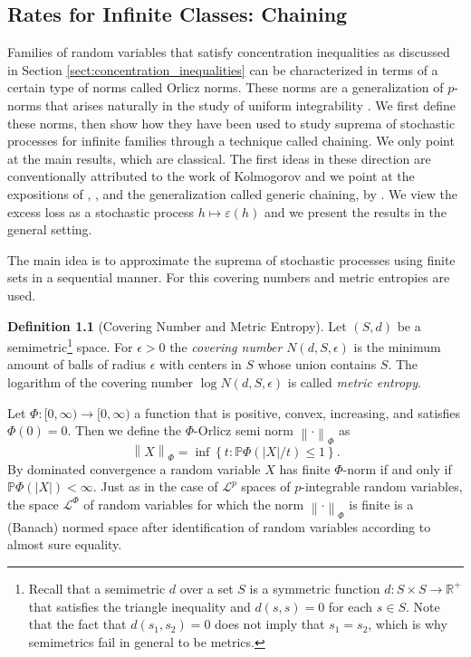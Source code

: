 \documentclass{uvamath}
\newcommand*{\reals}{\mathbb{R}}
\newcommand*{\calL}{\mathcal{L}}
\newcommand*{\bbP}{\mathbb{P}}
\newcommand*{\bracks}[1]{\left\{#1\right\}}
\newcommand*{\abs}[1]{\left|#1\right|}
\newcommand*{\norm}[1]{\left\lVert#1\right\rVert}
\theoremstyle{remark}
\theoremstyle{definition}
\theoremstyle{definition}
\newtheorem{definition}[theorem]{Definition}
\theoremstyle{definition}
\theoremstyle{definition}
\theoremstyle{definition}
\begin{document}
\begin{appendices}
\chapter{Rates for Infinite Classes: Chaining \label{sect:chaining}}

Families of random variables that satisfy concentration inequalities
as discussed in Section \ref{sect:concentration_inequalities} can be
characterized in terms of a certain type of norms called Orlicz
norms. These norms are a generalization of $p$-norms that arises
naturally in the study of uniform integrability \citep[see de la
Vallé-Poussin's theorem in][Chapter 1]{rao_theory_1991}. We first
define these norms, then show how they have been used to study suprema
of stochastic processes for infinite families through a technique
called chaining. We only point at the main results, which are
classical. The first ideas in these direction are conventionally
attributed to the work of Kolmogorov and we point at the expositions
of \citet[Chapter 2]{van_der_vaart_weak_1996}, \citet[Section
7.2]{pollard_convergence_1984}, and the generalization called generic
chaining, by \citet[Chapter 2]{talagrand_upper_2014}. We view the
excess loss as a stochastic process $h\mapsto\varepsilon(h)$ and we
present the results in the general setting.

The main idea is to approximate the suprema of stochastic processes
using finite sets in a sequential manner. For this covering numbers
and metric entropies are used.
\begin{definition}[Covering Number and Metric Entropy]\label{def:metric_entropy}
  Let $(S,d)$ be a semimetric\footnote{Recall that a semimetric $d$
    over a set $S$ is a symmetric function $d:S\times S\to\reals^+$
    that satisfies the triangle inequality and $d(s,s)=0$ for each
    $s\in S$. Note that the fact that $d(s_1,s_2)=0$ does not imply
    that $s_1=s_2$, which is why semimetrics fail in general to be
    metrics.} space. For $\epsilon>0$ the \textit{covering number}
  $N(d,S,\epsilon)$ is the minimum amount of balls of radius
  $\epsilon$ with centers in $S$ whose union contains $S$. The
  logarithm of the covering number $\log N(d,S,\epsilon)$ is called
  \textit{metric entropy}.
\end{definition}

Let $\Phi:[0,\infty)\to [0,\infty)$ a function that is positive,
convex, increasing, and satisfies $\Phi(0) = 0$. Then we define the
$\Phi$-Orlicz semi norm  $\norm{\cdot}_{\Phi}$ as
\begin{equation}\label{eq:def_orlicz_norm}
  \norm{X}_{\Phi} = \inf\bracks{t:\bbP\Phi(\abs{X} / t) \leq 1}.
\end{equation}
By dominated convergence a random variable $X$ has finite $\Phi$-norm
if and only if $\bbP\Phi(|X|)<\infty$. Just as in the case of
$\calL^p$ spaces of $p$-integrable random variables, the space
$\calL^{\Phi}$ of random variables for which the norm
$\norm{\cdot}_{\Phi}$ is finite is a (Banach) normed space after
identification of random variables according to almost sure equality.


\end{appendices}
\end{document}
